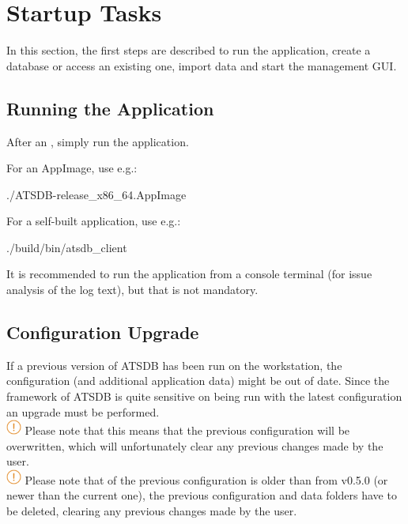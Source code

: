 \chapter{Startup Tasks}
\label{sec:tasks} 

In this section, the first steps are described to run the application, create a database or access an existing one, import data and start the management GUI.

\section{Running the Application}

After an , simply run the application.

For an AppImage, use e.g.:
\begin{cverbatim}
./ATSDB-release_x86_64.AppImage
\end{cverbatim}

For a self-built application, use e.g.:
\begin{cverbatim}
./build/bin/atsdb_client
\end{cverbatim}

It is recommended to run the application from a console terminal (for issue analysis of the log text), but that is not mandatory.

\section{Configuration Upgrade}

If a previous version of ATSDB has been run on the workstation, the configuration (and additional application data) might be out of date. Since the framework of ATSDB is quite sensitive on being run with the latest configuration an upgrade must be performed. \\

\includegraphics[width=0.5cm]{../../data/icons/hint.png} Please note that this means that the previous configuration will be overwritten, which will unfortunately clear any previous changes made by the user. \\

\includegraphics[width=0.5cm]{../../data/icons/hint.png} Please note that of the previous configuration is older than from v0.5.0 (or newer than the current one), the previous configuration and data folders have to be deleted, clearing any previous changes made by the user. \\

